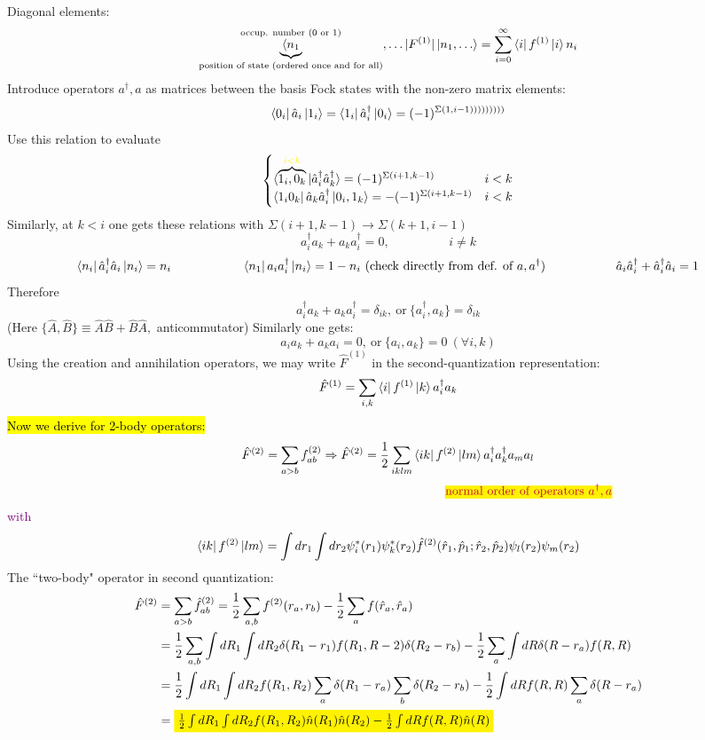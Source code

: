 \documentclass[10pt]{article}
\newcommand{\onebody}[1]{{#1}^{(1)}}
\newcommand{\twobody}[1]{{#1}^{(2)}}
\newcommand{\smallspace}{\hspace{2cm}}
\begin{document}
Diagonal elements:
$$
\underbrace{\langle n_1}_{\text{position of state (ordered once and for all)}}^{\text{occup. number (0 or 1)}}, \dots | \onebody F | \ket{n_1, \dots} = \sum_{i=0}^{\infty} \bra{i}\onebody f \ket{i} n_i
$$
Introduce operators $a^\dagger, a$ as matrices between the basis Fock states with the non-zero matrix elements:
$$
\bra{0_i}\hat a_i \ket{1_i} = \bra{1_i}\hat a_i^\dagger \ket{0_i} = (-1)^{\Sigma(1, i-1)))))))))}
$$
Use this relation to evaluate
\[
\begin{cases}
    \langle \overbrace{1_i, 0_k}^{\textcolor{yellow}{i < k}}|\hat a_i^\dagger \hat a_k^\dagger\rangle = (-1)^{\Sigma(i+1, k-1)} & i< k\\
    \bra{1_i 0_k}\hat a_k \hat a_i^\dagger \ket{0_i, 1_k} = -(-1)^{\Sigma(i+1, k-1)} & i < k
\end{cases}
\]
Similarly, at $k < i$ one gets these relations with $\Sigma(i+1, k-1) \to \Sigma(k+1, i-1)$
$$
a_i^\dagger a_k + a_k a_i^\dagger = 0, \smallspace i\neq k
$$
$$
\bra{n_i} \hat a_i^\dagger \hat a_i \ket{n_i} = n_i \smallspace \bra{n_1}a_ia^\dagger_i \ket{n_i} = 1-n_i \ \text{(check directly from def. of $a, a^\dagger$)} \smallspace \hat a_i \hat a_i^\dagger + \hat a_i^\dagger \hat a_i = 1
$$
Therefore
$$
a^\dagger _i a_k + a_k a_i^\dagger = \delta_{ik}, \ \text{or} \ \{ a_i^\dagger, a_k\} = \delta_{ik}
$$
(Here $\{ \hat A, \hat B\} \equiv \hat A \hat B + \hat B \hat A,$ anticommutator)
Similarly one gets:
$$
a_i a_k + a_k a_i = 0, \ \text{or} \ \{a_i, a_k\} = 0 \ (\forall i, k)
$$
Using the creation and annihilation operators, we may write $\onebody{\hat F}$ in the second-quantization representation:
$$
\onebody{\hat F} = \sum_{i,k} \bra{i} \onebody f \ket{k}a_i^\dagger a_k
$$
\textcolor{purple}{\hl{Now we derive for 2-body operators:}}
$$
\twobody {\hat F} = \sum_{a > b} \twobody f_{ab} \Rightarrow \twobody {\hat F} = \frac{1}{2} \sum_{iklm}\bra{ik} \twobody f \ket{lm}a_i^\dagger a_k^\dagger a_m a_l
$$
$$
\smallspace \smallspace \smallspace \smallspace \textcolor{purple}{\text{\hl{normal order of operators $a^\dagger, a$}}}
$$
\textcolor{purple}{with}
$$
\bra{ik} \twobody f \ket{lm} = \int dr_1 \int dr_2 \psi_i^\ast(r_1) \psi_k^\ast(r_2)\twobody{\hat f}(\hat r_1, \hat p_1; \hat r_2, \hat p_2)\psi_l(r_2)\psi_m(r_2)
$$
The ``two-body" operator in second quantization:
\begin{align*}
    \twobody{\hat F} &= \sum_{a > b}\twobody{\hat f}_{ab} = \frac{1}{2}\sum_{a,b} \twobody f(r_a, r_b) - \frac{1}{2}\sum_a f(\hat r_a, \hat r_a)\\
                     &= \frac{1}{2} \sum_{a,b} \int dR_1 \int dR_2 \delta(R_1-r_1) f(R_1, R-2)\delta(R_2-r_b) - \frac{1}{2} \sum_{a}\int dR \delta(R-r_a)f(R,R)\\
                     &= \frac{1}{2}\int dR_1 \int dR_2 f(R_1,R_2)\sum_a \delta(R_1-r_a)\sum_b\delta(R_2 - r_b)- \frac{1}{2}\int dR f(R, R)\sum_a\delta(R-r_a) \\
                     &= \colorbox{yellow}{$\frac{1}{2} \int dR_1\int dR_2 f(R_1,R_2) \hat n(R_1) \hat n(R_2) - \frac{1}{2} \int dR f(R, R) \hat n(R)$}
\end{align*}
\end{document}
